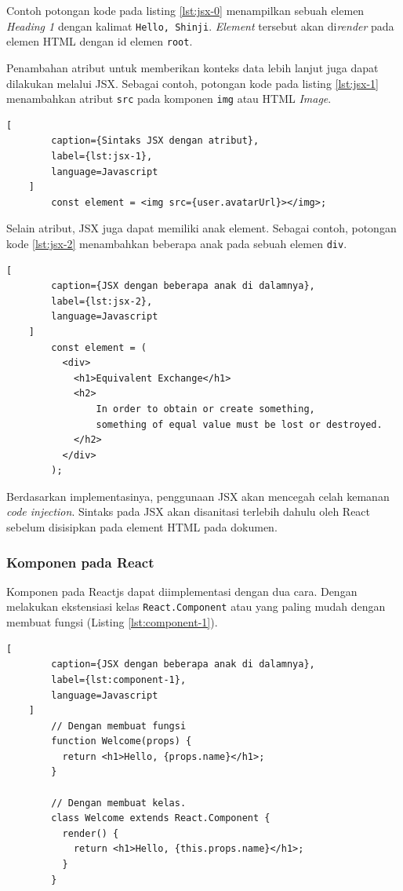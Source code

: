     Contoh potongan kode pada listing \ref{lst:jsx-0} menampilkan sebuah elemen
    \textit{Heading 1} dengan kalimat \texttt{Hello, Shinji}. \textit{Element}
    tersebut akan di\textit{render} pada elemen HTML dengan id elemen
    \texttt{root}.
    
    Penambahan atribut untuk memberikan konteks data lebih lanjut juga dapat
    dilakukan melalui JSX. Sebagai contoh, potongan kode pada listing
    \ref{lst:jsx-1} menambahkan atribut \texttt{src} pada komponen \texttt{img}
    atau HTML \textit{Image}.
    
    \begin{lstlisting}[
        caption={Sintaks JSX dengan atribut}, 
        label={lst:jsx-1}, 
        language=Javascript
    ]
        const element = <img src={user.avatarUrl}></img>;
    \end{lstlisting}
    
        
    Selain atribut, JSX juga dapat memiliki anak element. Sebagai contoh,
    potongan kode \ref{lst:jsx-2} menambahkan beberapa anak pada sebuah elemen
    \texttt{div}.
    \begin{lstlisting}[
        caption={JSX dengan beberapa anak di dalamnya}, 
        label={lst:jsx-2}, 
        language=Javascript
    ]
        const element = (
          <div>
            <h1>Equivalent Exchange</h1>
            <h2>
                In order to obtain or create something,
                something of equal value must be lost or destroyed.
            </h2>
          </div>
        );
    \end{lstlisting}
    
    Berdasarkan implementasinya, penggunaan JSX akan mencegah celah kemanan
    \textit{code injection}. Sintaks pada JSX akan disanitasi terlebih dahulu
    oleh React sebelum disisipkan pada element HTML pada dokumen.
    
    \subsubsection{Komponen pada React}
    Komponen pada Reactjs dapat diimplementasi dengan dua cara. Dengan melakukan
    ekstensiasi kelas \texttt{React.Component} atau yang paling mudah dengan
    membuat fungsi (Listing \ref{lst:component-1}).
    
    \begin{lstlisting}[
        caption={JSX dengan beberapa anak di dalamnya}, 
        label={lst:component-1}, 
        language=Javascript
    ]
        // Dengan membuat fungsi
        function Welcome(props) {
          return <h1>Hello, {props.name}</h1>;
        }
        
        // Dengan membuat kelas.
        class Welcome extends React.Component {
          render() {
            return <h1>Hello, {this.props.name}</h1>;
          }
        }
    \end{lstlisting}
    
